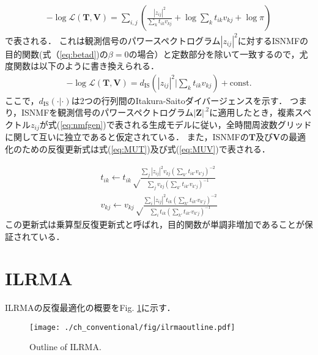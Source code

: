 \begin{align}
    -\log\mathcal{L}(\bm{T}, \bm{V}) = \sum_{i,j} \left( \frac{|z_{ij}|^2}{\sum_k t_{ik} v_{kj}} + \log \sum_k t_{ik} v_{kj} + \log \pi \right)
\end{align}
で表される．
これは観測信号のパワースペクトログラム$|z_{ij}|^2$に対するISNMFの目的関数(式（\ref{eq:betad})の$\beta = 0$の場合）と定数部分を除いて一致するので，尤度関数は以下のように書き換えられる．
\begin{align}
    -\log\mathcal{L}(\bm{T}, \bm{V}) = d_{\mathrm{IS}} \left( |z_{ij}|^2 | \sum_k t_{ik} v_{kj} \right) + \mathrm{const.}
    \label{eq:isnmf}
\end{align}
ここで，$d_{\mathrm{IS}}( \cdot | \cdot )$は2つの行列間のItakura-Saitoダイバージェンスを示す．
つまり，ISNMFを観測信号のパワースペクトログラム$|\bm{Z}|^{.2}$に適用したとき，複素スペクトル$z_{ij}$が式(\ref{eq:nmfgen})で表される生成モデルに従い，全時間周波数グリッドに関して互いに独立であると仮定されている．
また，ISNMFの$\bm{T}$及び$\bm{V}$の最適化のための反復更新式は式(\ref{eq:MUT})及び式(\ref{eq:MUV})で表される\cite{MU}．

\begin{align}
    t_{ik} \leftarrow t_{ik} \sqrt \frac{ \sum_j |z_{ij}|^2 v_{kj} \left( \sum_{k'} t_{ik'} v_{k'j} \right)^{-2} }{ \sum_j v_{kj} \left( \sum_{k'} t_{ik'} v_{k'j} \right)^{-1} } \label{eq:MUT} \\
    v_{kj} \leftarrow v_{kj} \sqrt \frac{ \sum_i |z_{ij}|^2 t_{ik} \left( \sum_{k'} t_{ik'} v_{k'j} \right)^{-2} }{ \sum_i t_{ik} \left( \sum_{k'} t_{ik'} v_{k'j} \right)^{-1} } \label{eq:MUV}
\end{align}
この更新式は乗算型反復更新式と呼ばれ，目的関数が単調非増加であることが保証されている．

\section{ILRMA}
\label{sec:conv:ilrma}

ILRMAの反復最適化の概要をFig. \ref{fig:ilrma_outline}に示す．

\begin{figure}[!t]
\centering
\texttt{[image: ./ch\_conventional/fig/ilrmaoutline.pdf]}
\caption{Outline of ILRMA.}
\label{fig:ilrma_outline}
\end{figure}

